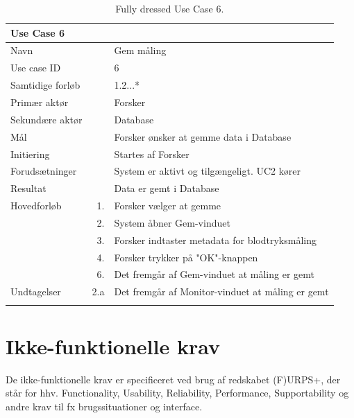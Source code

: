 \begin{longtabu} to  %
    {\large \textbf{Use Case 6}} && \\
    \toprule
    Navn &&    Gem måling\\
    Use case ID &&    6\\
    Samtidige forløb &&   1.2...*\\
    Primær aktør &&    Forsker\\
    Sekundære aktør &&	Database\\
    Mål &&    Forsker ønsker at gemme data i Database\\
    Initiering &&	Startes af Forsker\\
    Forudsætninger &&  System er aktivt og tilgængeligt. UC2 kører  \\
    Resultat &&		Data er gemt i Database                 \\ \midrule
    Hovedforløb &    1. &    Forsker vælger at gemme \\[-1ex]	
                &    2. &    System åbner Gem-vinduet \\
                &    3.	&	 Forsker indtaster metadata for blodtryksmåling \\[-1ex]
                &	 4. &    Forsker trykker på "OK"\--knappen  \\[-1ex]
                &	 6.	&	 Det fremgår af Gem-vinduet at måling er gemt\newline
                
                \\ \midrule
                
    Undtagelser &   2.a  &  Det fremgår af Monitor-vinduet at måling er gemt   \\ \bottomrule
    
\caption{Fully dressed Use Case 6.}
\label{UC6}
\end{longtabu}


\section{Ikke-funktionelle krav}
De ikke-funktionelle krav er specificeret ved brug af redskabet (F)URPS+, der står for hhv. Functionality, Usability, Reliability, Performance, Supportability og andre krav til fx brugssituationer og interface.  


